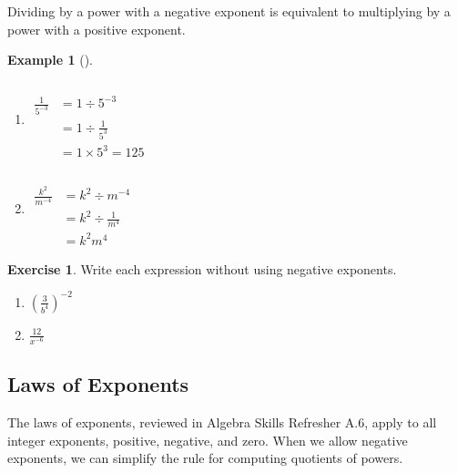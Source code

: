 \documentclass[10pt,]{book}
\theoremstyle{plain}
\theoremstyle{definition}
\theoremstyle{definition}
\theoremstyle{definition}
\newtheorem{example}[theorem]{Example}
\theoremstyle{definition}
\theoremstyle{definition}
\newtheorem{exercise}[theorem]{Exercise}
\numberwithin{equation}{section}
\newcommand{\amp}{ & }
\begin{document}
    Dividing by a power with a negative exponent is equivalent to multiplying by a power with a positive exponent.
%
\begin{example}[]\label{example-dividing-negative-exponents}
\leavevmode%
\begin{enumerate}[label=*\alph**]
\item\hypertarget{li-449}{}\(
            \begin{aligned} \\ \\
            \frac{1}{5^{−3}}\amp= 1 \div 5^{−3} \\
            \amp = 1 \div \frac{1}{5^3} \\
            \amp = 1 × 5^3 = 125
            \end{aligned}\)\item\hypertarget{li-450}{}\(
            \begin{aligned} \\ \\
            \frac{k^2}{m^{−4}} \amp = k^2 \div m^{-4} \\
            \amp = k^2 ÷ \frac{1}{m^4} \\
            \amp = k^2m^4
            \end{aligned}\)\end{enumerate}
\end{example}
\begin{exercise}\label{exercise-write-without-neg-exponents}
Write each expression without using negative exponents.
\leavevmode%
\begin{enumerate}[label=*\alph*]
\item\hypertarget{li-451}{}\(\left(\frac{3}{b^4}\right)^{-2}\)\item\hypertarget{li-452}{}\(\frac{12}{x^{-6}}\)\end{enumerate}
%
\end{exercise}
\typeout{************************************************}
\typeout{************************************************}
\subsection[Laws of Exponents]{Laws of Exponents}\label{subsection-66}
\index{}
    The laws of exponents, reviewed in Algebra Skills Refresher A.6, apply to all integer exponents, positive, negative, and zero. When we allow negative exponents, we can simplify the rule for computing quotients of powers.
%
\par
%
\par
\end{document}
